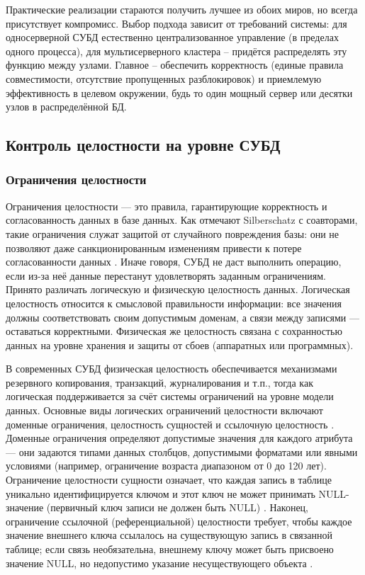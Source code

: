  Практические реализации стараются получить лучшее из обоих миров, но всегда присутствует компромисс. Выбор подхода зависит от требований системы: для односерверной СУБД естественно централизованное управление (в пределах одного процесса), для мультисерверного кластера – придётся распределять эту функцию между узлами. Главное – обеспечить корректность (единые правила совместимости, отсутствие пропущенных разблокировок) и приемлемую эффективность в целевом окружении, будь то один мощный сервер или десятки узлов в распределённой БД.

\subsection{Контроль целостности на уровне СУБД}
\subsubsection{Ограничения целостности}

 Ограничения целостности — это правила, гарантирующие корректность и согласованность данных в базе данных. Как отмечают Silberschatz с соавторами, такие ограничения служат защитой от случайного повреждения базы: они не позволяют даже санкционированным изменениям привести к потере согласованности данных \autocite{Silberschatz}. Иначе говоря, СУБД не даст выполнить операцию, если из-за неё данные перестанут удовлетворять заданным ограничениям. Принято различать логическую и физическую целостность данных. Логическая целостность относится к смысловой правильности информации: все значения должны соответствовать своим допустимым доменам, а связи между записями — оставаться корректными. Физическая же целостность связана с сохранностью данных на уровне хранения и защиты от сбоев (аппаратных или программных). 
 
 В современных СУБД физическая целостность обеспечивается механизмами резервного копирования, транзакций, журналирования и т.п., тогда как логическая поддерживается за счёт системы ограничений на уровне модели данных. Основные виды логических ограничений целостности включают доменные ограничения, целостность сущностей и ссылочную целостность \autocite{ElmasriNavathe}. Доменные ограничения определяют допустимые значения для каждого атрибута — они задаются типами данных столбцов, допустимыми форматами или явными условиями (например, ограничение возраста диапазоном от 0 до 120 лет). Ограничение целостности сущности означает, что каждая запись в таблице уникально идентифицируется ключом и этот ключ не может принимать NULL-значение (первичный ключ записи не должен быть NULL) \autocite{ElmasriNavathe}. Наконец, ограничение ссылочной (референциальной) целостности требует, чтобы каждое значение внешнего ключа ссылалось на существующую запись в связанной таблице; если связь необязательна, внешнему ключу может быть присвоено значение NULL, но недопустимо указание несуществующего объекта \autocite{ElmasriNavathe}. 

